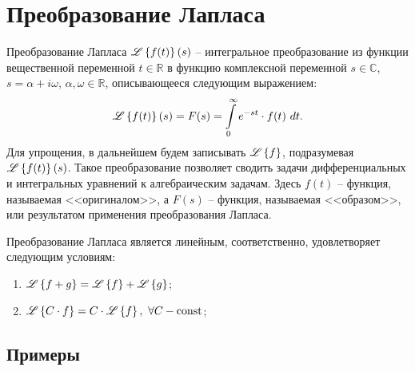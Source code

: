\section{Преобразование Лапласа}

	Преобразование Лапласа $\mathscr{L} \left\lbrace {f(t)} \right\rbrace \left( s \right)$ -- интегральное преобразование из функции вещественной переменной $t \in \mathbb{R}$ в функцию комплексной переменной $s \in \mathbb{C}$, $s = \alpha + i \omega$, $\alpha, \omega \in \mathbb{R}$, описывающееся следующим выражением:
	\[ \mathscr{L} \left\lbrace {f(t)} \right\rbrace \left( s \right) = F(s) = \int\limits_{0}^{\infty} e^{-st} \cdot f(t) ~ dt. \]
	Для упрощения, в дальнейшем будем записывать $\mathscr{L} \left\lbrace {f} \right\rbrace$, подразумевая $\mathscr{L} \left\lbrace {f(t)} \right\rbrace \left( s \right)$. Такое преобразование позволяет сводить задачи дифференциальных и интегральных уравнений к алгебраическим задачам. Здесь $f(t)$ -- функция, называемая <<оригиналом>>, а $F(s)$ -- функция, называемая <<образом>>, или результатом применения преобразования Лапласа.

	Преобразование Лапласа является линейным, соответственно, удовлетворяет следующим условиям:
	\begin{enumerate}
		\item \( \mathscr{L} \left\lbrace {f + g} \right\rbrace = \mathscr{L} \left\lbrace {f} \right\rbrace + \mathscr{L} \left\lbrace {g} \right\rbrace \);
		\item \( \mathscr{L} \left\lbrace {C \cdot f} \right\rbrace = C \cdot \mathscr{L} \left\lbrace {f} \right\rbrace, ~ \forall C - \mathrm{const} \);
	\end{enumerate}

	\subsection{Примеры}

